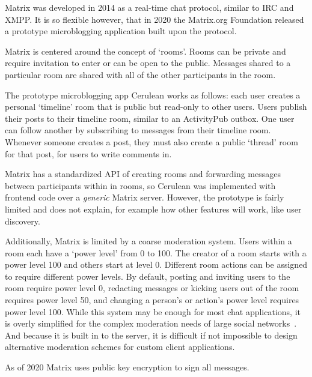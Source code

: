 Matrix was developed in 2014 as a real-time chat protocol, similar to IRC and XMPP.
It is so flexible however, that in 2020 the Matrix.org Foundation released a prototype microblogging application built upon the protocol.

Matrix is centered around the concept of `rooms'.
Rooms can be private and require invitation to enter or can be open to the public.
Messages shared to a particular room are shared with all of the other participants in the room.

The prototype microblogging app Cerulean works as follows:
each user creates a personal `timeline' room that is public but read-only to other users. Users publish their posts to their timeline room, similar to an ActivityPub outbox. One user can follow another by subscribing to messages from their timeline room.
Whenever someone creates a post, they must also create a public `thread' room for that post, for users to write comments in.

Matrix has a standardized API of creating rooms and forwarding messages between participants within in rooms, so Cerulean was implemented with frontend code over a \emph{generic} Matrix server.
However, the prototype is fairly limited and does not explain, for example how other features will work, like user discovery.

Additionally, Matrix is limited by a coarse moderation system.
Users within a room each have a `power level' from 0 to 100.
The creator of a room starts with a power level 100 and others start at level 0.
Different room actions can be assigned to require different power levels. By default, posting and inviting users to the room require power level 0, redacting messages or kicking users out of the room requires power level 50, and changing a person's or action's power level requires power level 100.
While this system may be enough for most chat applications, it is overly simplified for the complex moderation needs of large social networks~\cite{policykit}.   And because it is built in to the server, it is difficult if not impossible to design alternative moderation schemes for custom client applications.


As of 2020 Matrix uses public key encryption to sign all messages.


